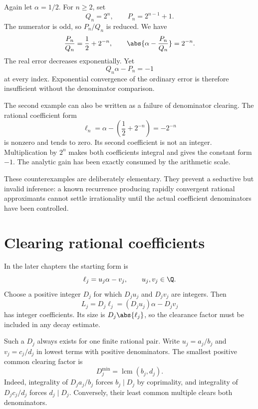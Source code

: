 \begin{example}
\label{ex:c02-exponential-rational}
Again let $\alpha=1/2$. For $n\geq2$, set
\[
Q_n=2^n,\qquad P_n=2^{n-1}+1.
\]
The numerator is odd, so $P_n/Q_n$ is reduced. We have
\begin{equation}
\frac{P_n}{Q_n}=\frac12+2^{-n},\qquad
\abs{\alpha-\frac{P_n}{Q_n}}=2^{-n}.
\label{eq:c02-exponential-rational}
\end{equation}
The real error decreases exponentially. Yet
\[
Q_n\alpha-P_n=-1
\]
at every index. Exponential convergence of the ordinary error is therefore insufficient without the denominator comparison.
\end{example}

The second example can also be written as a failure of denominator clearing. The rational coefficient form
\[
\ell_n=\alpha-\left(\frac12+2^{-n}\right)=-2^{-n}
\]
is nonzero and tends to zero. Its second coefficient is not an integer. Multiplication by $2^n$ makes both coefficients integral and gives the constant form $-1$. The analytic gain has been exactly consumed by the arithmetic scale.

These counterexamples are deliberately elementary. They prevent a seductive but invalid inference: a known recurrence producing rapidly convergent rational approximants cannot settle irrationality until the actual coefficient denominators have been controlled.

\section{Clearing rational coefficients}

In the later chapters the starting form is
\begin{equation}
\ell_j=u_j\alpha-v_j,\qquad u_j,v_j\in\Q.
\label{eq:c02-rational-form}
\end{equation}
Choose a positive integer $D_j$ for which $D_ju_j$ and $D_jv_j$ are integers. Then
\begin{equation}
L_j=D_j\ell_j=(D_ju_j)\alpha-D_jv_j
\label{eq:c02-cleared-form}
\end{equation}
has integer coefficients. Its size is $D_j\abs{\ell_j}$, so the clearance factor must be included in any decay estimate.

Such a $D_j$ always exists for one finite rational pair. Write $u_j=a_j/b_j$ and $v_j=c_j/d_j$ in lowest terms with positive denominators. The smallest positive common clearing factor is
\begin{equation}
D_j^{\min}=\operatorname{lcm}(b_j,d_j).
\label{eq:c02-minimal-clearance}
\end{equation}
Indeed, integrality of $D_ja_j/b_j$ forces $b_j\mid D_j$ by coprimality, and integrality of $D_jc_j/d_j$ forces $d_j\mid D_j$. Conversely, their least common multiple clears both denominators.

